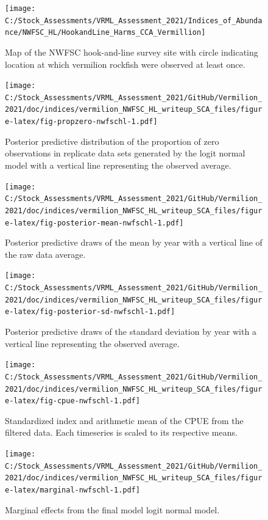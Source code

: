 \documentclass[
  english,
  a4paper,
]{article}
\begin{document}
\FloatBarrier

\begin{figure}
\texttt{[image: C:/Stock\_Assessments/VRML\_Assessment\_2021/Indices\_of\_Abundance/NWFSC\_HL/HookandLine\_Harms\_CCA\_Vermillion]} \caption{Map of the NWFSC hook-and-line survey site with circle indicating location at which vermilion rockfish were observed at least once.}\label{fig:spp-sites}
\end{figure}

\begin{figure}
\centering
\texttt{[image: C:/Stock\_Assessments/VRML\_Assessment\_2021/GitHub/Vermilion\_2021/doc/indices/vermilion\_NWFSC\_HL\_writeup\_SCA\_files/figure-latex/fig-propzero-nwfschl-1.pdf]}
\caption{\label{fig:fig-propzero-nwfschl}Posterior predictive distribution of the proportion of zero observations in replicate data sets generated by the logit normal model with a vertical line representing the observed average.}
\end{figure}

\begin{figure}
\centering
\texttt{[image: C:/Stock\_Assessments/VRML\_Assessment\_2021/GitHub/Vermilion\_2021/doc/indices/vermilion\_NWFSC\_HL\_writeup\_SCA\_files/figure-latex/fig-posterior-mean-nwfschl-1.pdf]}
\caption{\label{fig:fig-posterior-mean-nwfschl}Posterior predictive draws of the mean by year with a vertical line of the raw data average.}
\end{figure}

\begin{figure}
\centering
\texttt{[image: C:/Stock\_Assessments/VRML\_Assessment\_2021/GitHub/Vermilion\_2021/doc/indices/vermilion\_NWFSC\_HL\_writeup\_SCA\_files/figure-latex/fig-posterior-sd-nwfschl-1.pdf]}
\caption{\label{fig:fig-posterior-sd-nwfschl}Posterior predictive draws of the standard deviation by year with a vertical line representing the observed average.}
\end{figure}

\begin{figure}
\centering
\texttt{[image: C:/Stock\_Assessments/VRML\_Assessment\_2021/GitHub/Vermilion\_2021/doc/indices/vermilion\_NWFSC\_HL\_writeup\_SCA\_files/figure-latex/fig-cpue-nwfschl-1.pdf]}
\caption{\label{fig:fig-cpue-nwfschl}Standardized index and arithmetic mean of the CPUE from the filtered data. Each timeseries is scaled to its respective means.}
\end{figure}

\begin{figure}
\centering
\texttt{[image: C:/Stock\_Assessments/VRML\_Assessment\_2021/GitHub/Vermilion\_2021/doc/indices/vermilion\_NWFSC\_HL\_writeup\_SCA\_files/figure-latex/marginal-nwfschl-1.pdf]}
\caption{\label{fig:marginal-nwfschl}Marginal effects from the final model logit normal model.}
\end{figure}
\end{document}
